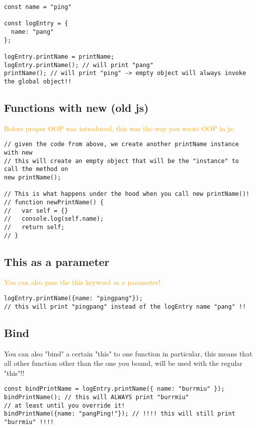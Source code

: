 \documentclass[main.tex,fontsize=6pt,paper=a4,paper=landscape,DIV=calc,]{scrartcl}
\begin{document}
\begin{multicols*}{4}
\begin{lstlisting}
const name = "ping"

const logEntry = {
  name: "pang"
};

logEntry.printName = printName;
logEntry.printName(); // will print "pang"
printName(); // will print "ping" -> empty object will always invoke the global object!!
\end{lstlisting}
\vspace{2mm}

\subsection{Functions with new (old js)}  
\textcolor{orange}{Before proper OOP was introduced, this was the way you wrote OOP in js:}\newline
\vspace{-2mm}
\begin{lstlisting}
// given the code from above, we create another printName instance with new
// this will create an empty object that will be the "instance" to call the method on
new printName();

// This is what happens under the hood when you call new printName()!
// function newPrintName() {
//   var self = {}
//   console.log(self.name);
//   return self;
// }
\end{lstlisting}
\vspace{2mm}

\subsection{This as a parameter}  
\textcolor{orange}{You can also pass the this keyword as a parameter!}\newline
\vspace{-2mm}
\begin{lstlisting}
logEntry.printName({name: "pingpang"});
// this will print "pingpang" instead of the logEntry name "pang" !!
\end{lstlisting}
\vspace{2mm}

\subsection{Bind}  
You can also "bind" a certain "this" to one function in particular, this means that all other function other than the one you bound, will be used with the regular "this"!!\newline
\vspace{-2mm}
\begin{lstlisting}
const bindPrintName = logEntry.printName({ name: "burrmiu" });
bindPrintName(); // this will ALWAYS print "burrmiu"
// at least until you override it!
bindPrintName({name: "pangPing!"}); // !!!! this will still print "burrmiu" !!!!
\end{lstlisting}
\vspace{2mm}



\end{multicols*}
\end{document}

